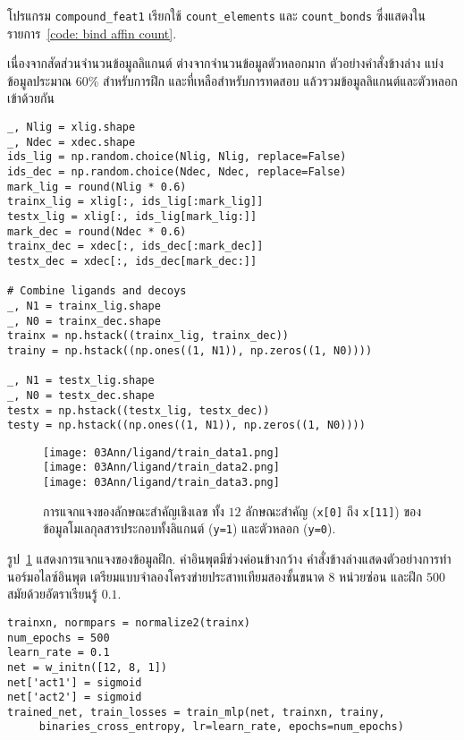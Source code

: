 \begin{Exercise}
โปรแกรม \verb|compound_feat1|
เรียกใช้ \verb|count_elements|
และ \verb|count_bonds|
ซึ่งแสดงในรายการ~\ref{code: bind affin count}.





เนื่องจากสัดส่วนจำนวนข้อมูลลิแกนต์ 
ต่างจากจำนวนข้อมูลตัวหลอกมาก
ตัวอย่างคำสั่งข้างล่าง แบ่งข้อมูลประมาณ $60\%$ สำหรับการฝึก และที่เหลือสำหรับการทดสอบ
แล้วรวมข้อมูลลิแกนต์และตัวหลอกเข้าด้วยกัน
\begin{Verbatim}[fontsize=\small]
_, Nlig = xlig.shape
_, Ndec = xdec.shape
ids_lig = np.random.choice(Nlig, Nlig, replace=False)
ids_dec = np.random.choice(Ndec, Ndec, replace=False)
mark_lig = round(Nlig * 0.6)
trainx_lig = xlig[:, ids_lig[:mark_lig]]
testx_lig = xlig[:, ids_lig[mark_lig:]]
mark_dec = round(Ndec * 0.6)
trainx_dec = xdec[:, ids_dec[:mark_dec]]
testx_dec = xdec[:, ids_dec[mark_dec:]]

# Combine ligands and decoys
_, N1 = trainx_lig.shape
_, N0 = trainx_dec.shape
trainx = np.hstack((trainx_lig, trainx_dec))
trainy = np.hstack((np.ones((1, N1)), np.zeros((1, N0))))

_, N1 = testx_lig.shape
_, N0 = testx_dec.shape
testx = np.hstack((testx_lig, testx_dec))
testy = np.hstack((np.ones((1, N1)), np.zeros((1, N0))))
\end{Verbatim}

\begin{figure}[H]
	\begin{center}
		\texttt{[image: 03Ann/ligand/train\_data1.png]}
		\\
		\texttt{[image: 03Ann/ligand/train\_data2.png]}
		\\
		\texttt{[image: 03Ann/ligand/train\_data3.png]}
	\end{center}
	\caption[การแจกแจงของข้อมูลโมเลกุล]{การแจกแจงของลักษณะสำคัญเชิงเลข ทั้ง $12$ ลักษณะสำคัญ (\texttt{x[0]} ถึง \texttt{x[11]}) ของข้อมูลโมเลกุลสารประกอบทั้งลิแกนต์ (\texttt{y=1}) และตัวหลอก (\texttt{y=0}).}
	\label{fig: bind affin data}
\end{figure}

รูป~\ref{fig: bind affin data}
แสดงการแจกแจงของข้อมูลฝึก.
ค่าอินพุตมีช่วงค่อนข้างกว้าง
คำสั่งข้างล่างแสดงตัวอย่างการทำนอร์มอไลซ์อินพุต
เตรียมแบบจำลองโครงข่ายประสาทเทียมสองชั้นขนาด $8$ หน่วยซ่อน
และฝึก $500$ สมัยด้วยอัตราเรียนรู้ $0.1$.
\begin{Verbatim}[fontsize=\small]
trainxn, normpars = normalize2(trainx)
num_epochs = 500
learn_rate = 0.1
net = w_initn([12, 8, 1])
net['act1'] = sigmoid
net['act2'] = sigmoid
trained_net, train_losses = train_mlp(net, trainxn, trainy, 
     binaries_cross_entropy, lr=learn_rate, epochs=num_epochs)
\end{Verbatim}


\end{Exercise}
